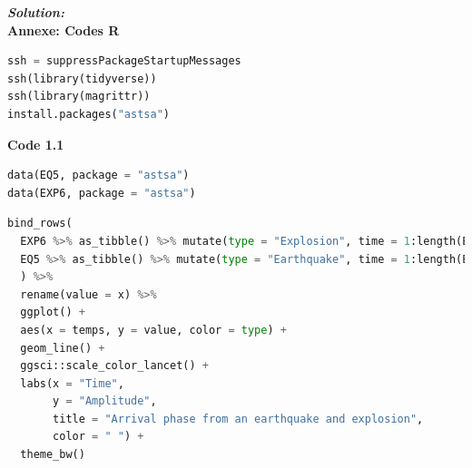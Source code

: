 \documentclass{homework}
\begin{document}
\textit{\textbf{Solution:}}\\


\newpage
\centering
\textbf{\Huge{Annexe: Codes R}}

\begin{lstlisting}[language=Python]
ssh = suppressPackageStartupMessages
ssh(library(tidyverse))
ssh(library(magrittr))
install.packages("astsa")
\end{lstlisting}

\textbf{\Large{Code 1.1}}

\begin{lstlisting}[language=Python]
data(EQ5, package = "astsa")
data(EXP6, package = "astsa")
\end{lstlisting}

\begin{lstlisting}[language=Python]
bind_rows(
  EXP6 %>% as_tibble() %>% mutate(type = "Explosion", time = 1:length(EXP6)),
  EQ5 %>% as_tibble() %>% mutate(type = "Earthquake", time = 1:length(EQ5))
  ) %>%
  rename(value = x) %>%
  ggplot() +
  aes(x = temps, y = value, color = type) +
  geom_line() +
  ggsci::scale_color_lancet() +
  labs(x = "Time",
       y = "Amplitude",
       title = "Arrival phase from an earthquake and explosion",
       color = " ") +
  theme_bw()
\end{lstlisting}
\end{document}

